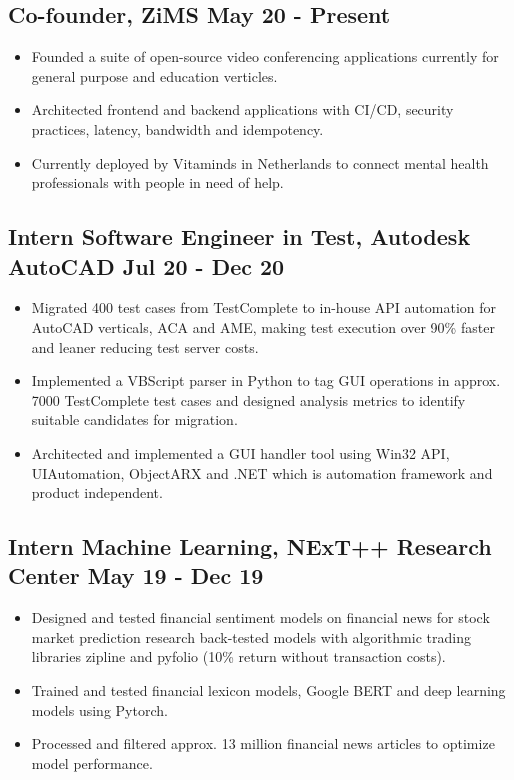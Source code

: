 \documentclass[9pts]{article}
\begin{document}
\subsection*{Co-founder, ZiMS \href{https://github.com/zims-live}{\faGithub} \hfill May 20 - Present}
\begin{itemize}
    \item Founded a suite of open-source video conferencing applications currently for general purpose and education verticles.
    \item Architected frontend and backend applications with CI/CD, security practices, latency, bandwidth and idempotency.
    \item Currently deployed by Vitaminds in Netherlands to connect mental health professionals with people in need of help.
\end{itemize}

\subsection*{Intern Software Engineer in Test, Autodesk AutoCAD \hfill Jul 20 - Dec 20}
\begin{itemize}
    \item Migrated 400 test cases from TestComplete to in-house API automation for AutoCAD verticals, ACA and AME, making test execution over 90\% faster and leaner reducing test server costs.
    \item Implemented a VBScript parser in Python to tag GUI operations in approx. 7000 TestComplete test cases and designed analysis metrics to identify suitable candidates for migration.
    \item Architected and implemented a GUI handler tool using Win32 API, UIAutomation, ObjectARX and .NET which is automation framework and product independent.
\end{itemize}

\subsection*{ Intern Machine Learning, NExT++ Research Center \href{https://github.com/GelliFrancesco/assetpriceprediction}{\faGithub} \hfill May 19 - Dec 19}
\begin{itemize}
    \item Designed and tested financial sentiment models on financial news for stock market prediction research back-tested models with algorithmic trading libraries zipline and pyfolio (10\% return without transaction costs).
    \item Trained and tested financial lexicon models, Google BERT and deep learning models using Pytorch.
    \item Processed and filtered approx. 13 million financial news articles to optimize model performance.
\end{itemize}
\end{document}
